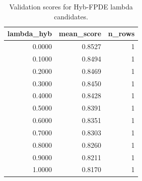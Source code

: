 \begin{table}[t]
\caption{Validation scores for Hyb-FPDE lambda candidates.}
\label{tab:lambda_distribution_computed}
\centering
\begin{tabular}{rrr}
\toprule
lambda\_hyb & mean\_score & n\_rows \\
\midrule
0.0000 & 0.8527 & 1 \\
0.1000 & 0.8494 & 1 \\
0.2000 & 0.8469 & 1 \\
0.3000 & 0.8450 & 1 \\
0.4000 & 0.8428 & 1 \\
0.5000 & 0.8391 & 1 \\
0.6000 & 0.8351 & 1 \\
0.7000 & 0.8303 & 1 \\
0.8000 & 0.8260 & 1 \\
0.9000 & 0.8211 & 1 \\
1.0000 & 0.8170 & 1 \\
\bottomrule
\end{tabular}

\end{table}
